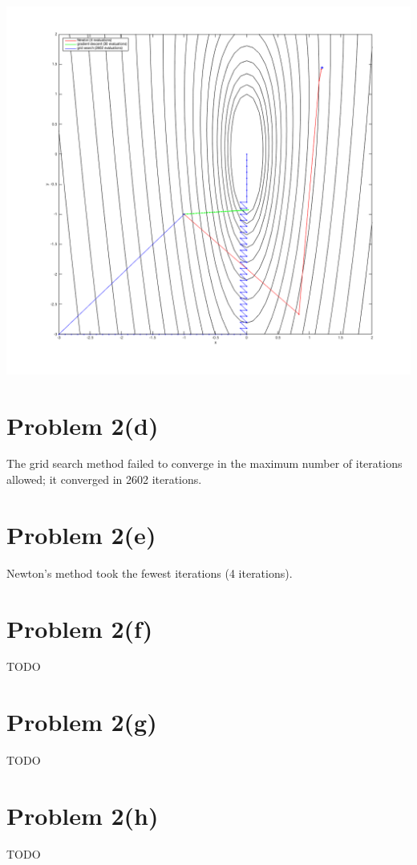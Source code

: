 \documentclass{article}
\begin{document}

\includegraphics[scale=0.5]{code/2c.png}

\section*{Problem 2(d)}

The grid search method failed to converge in the maximum number of iterations allowed; it converged in 2602 iterations.

\section*{Problem 2(e)}

Newton's method took the fewest iterations (4 iterations).

\section*{Problem 2(f)}

TODO

\section*{Problem 2(g)}

TODO

\section*{Problem 2(h)}

TODO
\end{document}

